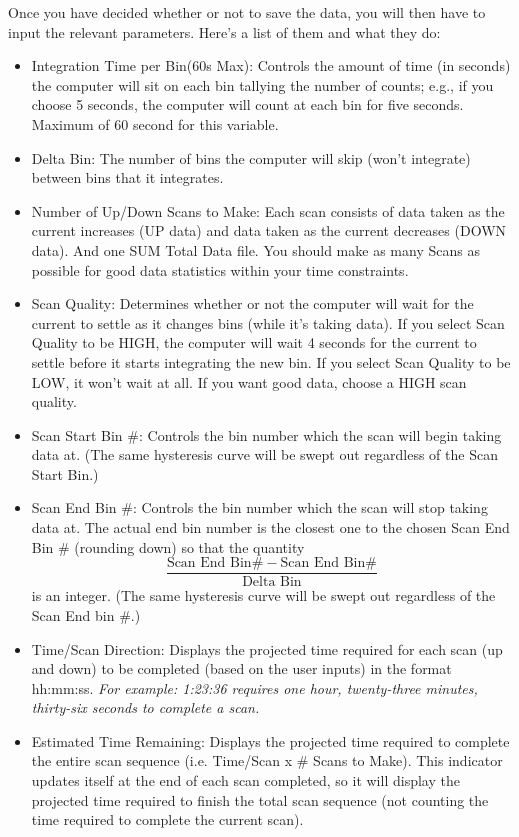 \documentclass{../lab}
\begin{document}
Once you have decided whether or not to save the data, you will then have to input the relevant parameters. Here's a list of them and what they do:
\begin{itemize}
    \item Integration Time per Bin(60s Max): Controls the amount of time (in seconds) the computer will sit on each bin tallying the number of counts; e.g., if you choose 5 seconds, the computer will count at each bin for five seconds. Maximum of 60 second for this variable.

    \item Delta Bin: The number of bins the computer will skip (won't integrate) between bins that it integrates.

    \item Number of Up/Down Scans to Make: Each scan consists of data taken as the current increases (UP data) and data taken as the current decreases (DOWN data). And one SUM Total Data file. You should make as many Scans as possible for good data statistics within your time constraints.

    \item Scan Quality: Determines whether or not the computer will wait for the current to settle as it changes bins (while it's taking data). If you select Scan Quality to be HIGH, the computer will wait 4 seconds for the current to settle before it starts integrating the new bin. If you select Scan Quality to be LOW, it won't wait at all. If you want good data, choose a HIGH scan quality.

    \item Scan Start Bin \#: Controls the bin number which the scan will begin taking data at. (The same hysteresis curve will be swept out regardless of the Scan Start Bin.)

    \item Scan End Bin \#: Controls the bin number which the scan will stop taking data at. The actual end bin number is the closest one to the chosen Scan End Bin \# (rounding down) so that the quantity
    \[
    \frac{\text{Scan End Bin} \# - \text{Scan End Bin} \#}{\text{Delta Bin}}
    \]
    is an integer. (The same hysteresis curve will be swept out regardless of the Scan End bin \#.)

    \item Time/Scan Direction: Displays the projected time required for each scan (up and down) to be completed (based on the user inputs) in the format hh:mm:ss. \emph{For example: 1:23:36 requires one hour, twenty-three minutes, thirty-six seconds to complete a scan.}

    \item Estimated Time Remaining: Displays the projected time required to complete the entire scan sequence (i.e. Time/Scan x \# Scans to Make). This indicator updates itself at the end of each scan completed, so it will display the projected time required to finish the total scan sequence (not counting the time required to complete the current scan).

\end{itemize}
\end{document}
